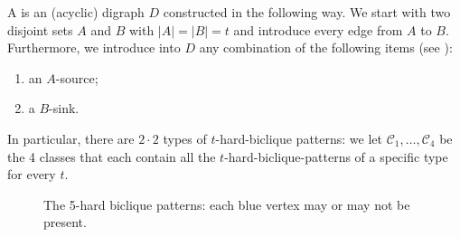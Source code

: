 \begin{definition}[\hardbiclique{t}]
  \label{def:cleanedbiclique}
A \emph{} is an (acyclic) digraph $D$ constructed in the following way. We start with two disjoint sets $A$ and $B$ with  $|A| = |B| = t$ and introduce every edge from $A$ to $B$. Furthermore, we introduce into $D$ any combination of the following items (see ): 
\begin{enumerate}
\item an $A$-source;
\item a $B$-sink.
\end{enumerate}
In particular, there are $2 \cdot 2$ types of $t$-hard-biclique patterns: we let $\mathcal{C}_1,\ldots,\mathcal{C}_4$ be the 4 classes that each contain all the $t$-hard-biclique-patterns of a specific type for every $t$.
\end{definition}

\begin{figure}
\centering
{}
\caption{The 5-hard biclique patterns: each blue vertex may  or may not be present.}
\label{fig:cleanedbiclique}
\end{figure}


